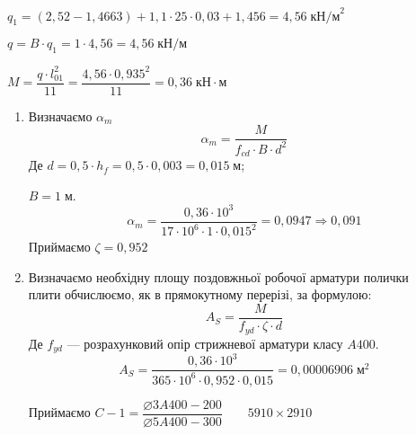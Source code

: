 \documentclass[a4paper,14pt]{article}
\begin{document}
$q_1 = (2,52 - 1,4663) + 1,1 \cdot 25 \cdot 0,03 + 1,456 = 4,56\;\textit{кН/м}^2$

$q = B \cdot q_1 = 1 \cdot 4,56 = 4,56\;\textit{кН/м}$

$M = \dfrac{q \cdot l_{01}^2}{11} = \dfrac{4,56 \cdot 0,935^2}{11} = 0,36\;\textit{кН} \cdot \textit{м}$

\begin{enumerate}
    \item Визначаємо $\alpha_m$
        \begin{equation}
            \alpha_m = \dfrac{M}{f_{cd} \cdot B \cdot d^2}
        \end{equation}
        Де $d = 0,5 \cdot h_f = 0,5 \cdot 0,003 = 0,015\;\textit{м}$;

        $B = 1\;\textit{м}$.
        $$\alpha_m = \dfrac{0,36 \cdot 10^3}{17 \cdot 10^6 \cdot 1 \cdot 0,015^2} = 0,0947 \Longrightarrow 0,091$$
        Приймаємо $\zeta = 0,952$
    \item Визначаємо необхідну площу поздовжньої робочої арматури полички\\плити обчислюємо, як в прямокутному перерізі, за формулою:
        \begin{equation}
            A_S = \dfrac{M}{f_{yd} \cdot \zeta \cdot d}
        \end{equation}
        Де $f_{yd}$ --- розрахунковий опір стрижневої арматури класу $A400$.
        $$A_S = \dfrac{0,36 \cdot 10^3}{365 \cdot 10^6 \cdot 0,952 \cdot 0,015} = 0,00006906\;\textit{м}^2$$

        Приймаємо $C-1 = \dfrac{\varnothing3A400-200}{\varnothing5A400-300} \qquad 5910 \times 2910$
\end{enumerate}
\end{document}
